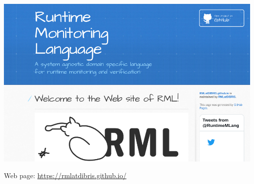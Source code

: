 \documentclass[10pt,usenames,dvipsnames]{beamer}
\begin{document}




\begin{frame}{\rml}
  \begin{center}
    \includegraphics[height=0.7\textheight]{images/rmlweb}
  \end{center}

  \rml Web page: \href{https://rmlatdibris.github.io/}{https://rmlatdibris.github.io/}
\end{frame}
\end{document}
